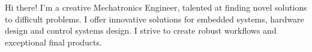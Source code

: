 %
%
%
\par{
	Hi there! I'm a creative Mechatronics Engineer, talented at finding novel solutions to difficult problems. I offer innovative
	solutions for embedded systems, hardware design and control systems design. I strive to create robust
	workflows and exceptional final products.
}